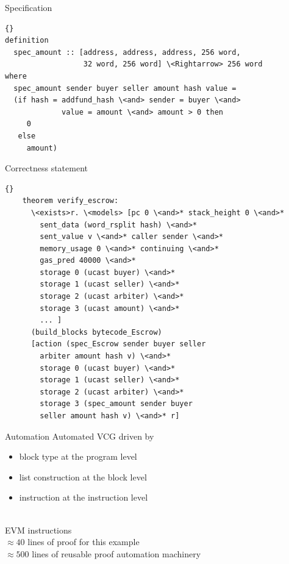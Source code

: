 \documentclass{beamer}
\begin{document}
\begin{frame}[fragile]{Specification}
		\begin{lstlisting}[language=Isar,keywords={[3]{addfund\_hash,pay\_hash,refund\_hash,}}]{} 
definition
  spec_amount :: [address, address, address, 256 word, 
                  32 word, 256 word] \<Rightarrow> 256 word
where
  spec_amount sender buyer seller amount hash value =
  (if hash = addfund_hash \<and> sender = buyer \<and>
             value = amount \<and> amount > 0 then
     0
   else
     amount)
\end{lstlisting}	
\end{frame}

\begin{frame}[fragile]{Correctness statement}
	\begin{lstlisting}[language=Isar,keywords={[3]{hash,sender,buyer,seller,arbiter,amount,v}}]{}
	theorem verify_escrow:
	  \<exists>r. \<models> [pc 0 \<and>* stack_height 0 \<and>*
	    sent_data (word_rsplit hash) \<and>*
	    sent_value v \<and>* caller sender \<and>*
	    memory_usage 0 \<and>* continuing \<and>*
	    gas_pred 40000 \<and>*
	    storage 0 (ucast buyer) \<and>*
	    storage 1 (ucast seller) \<and>*
	    storage 2 (ucast arbiter) \<and>*
	    storage 3 (ucast amount) \<and>*
	    ... ]
	  (build_blocks bytecode_Escrow)
	  [action (spec_Escrow sender buyer seller
	    arbiter amount hash v) \<and>*
	    storage 0 (ucast buyer) \<and>*
	    storage 1 (ucast seller) \<and>*
	    storage 2 (ucast arbiter) \<and>*
	    storage 3 (spec_amount sender buyer
	    seller amount hash v) \<and>* r]
	\end{lstlisting}
\end{frame}

\begin{frame}{Automation}
	Automated VCG driven by 
	\begin{itemize}
		\item block type at the program level
		\item list construction at the block level
		\item instruction at the instruction level
	\end{itemize}
	~\\
	 EVM instructions \\
	$\approx 40$ lines of proof for this example \\
	$\approx 500$ lines of reusable
	proof automation machinery
\end{frame}
\end{document}
